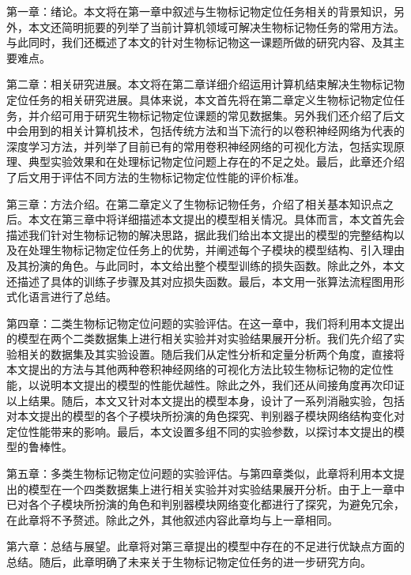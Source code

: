 第一章：绪论。本文将在第一章中叙述与生物标记物定位任务相关的背景知识，另外，本文还简明扼要的列举了当前计算机领域可解决生物标记物任务的常用方法。与此同时，我们还概述了本文的针对生物标记物这一课题所做的研究内容、及其主要难点。

第二章：相关研究进展。本文将在第二章详细介绍运用计算机结束解决生物标记物定位任务的相关研究进展。具体来说，本文首先将在第二章定义生物标记物定位任务，并介绍可用于研究生物标记物定位课题的常见数据集。另外我们还介绍了后文中会用到的相关计算机技术，包括传统方法和当下流行的以卷积神经网络为代表的深度学习方法，并列举了目前已有的常用卷积神经网络的可视化方法，包括实现原理、典型实验效果和在处理标记物定位问题上存在的不足之处。最后，此章还介绍了后文用于评估不同方法的生物标记物定位性能的评价标准。

第三章：方法介绍。在第二章定义了生物标记物任务，介绍了相关基本知识点之后。本文在第三章中将详细描述本文提出的模型相关情况。具体而言，本文首先会描述我们针对生物标记物的解决思路，据此我们给出本文提出的模型的完整结构以及在处理生物标记物定位任务上的优势，并阐述每个子模块的模型结构、引入理由及其扮演的角色。与此同时，本文给出整个模型训练的损失函数。除此之外，本文还描述了具体的训练子步骤及其对应损失函数。最后，本文用一张算法流程图用形式化语言进行了总结。

第四章：二类生物标记物定位问题的实验评估。在这一章中，我们将利用本文提出的模型在两个二类数据集上进行相关实验并对实验结果展开分析。我们先介绍了实验相关的数据集及其实验设置。随后我们从定性分析和定量分析两个角度，直接将本文提出的方法与其他两种卷积神经网络的可视化方法比较生物标记物的定位性能，以说明本文提出的模型的性能优越性。除此之外，我们还从间接角度再次印证以上结果。随后，本文又针对本文提出的模型本身，设计了一系列消融实验，包括对本文提出的模型的各个子模块所扮演的角色探究、判别器子模块网络结构变化对定位性能带来的影响。最后，本文设置多组不同的实验参数，以探讨本文提出的模型的鲁棒性。

第五章：多类生物标记物定位问题的实验评估。与第四章类似，此章将利用本文提出的模型在一个四类数据集上进行相关实验并对实验结果展开分析。由于上一章中已对各个子模块所扮演的角色和判别器模块网络变化都进行了探究，为避免冗余，在此章将不予赘述。除此之外，其他叙述内容此章均与上一章相同。

第六章：总结与展望。此章将对第三章提出的模型中存在的不足进行优缺点方面的总结。随后，此章明确了未来关于生物标记物定位任务的进一步研究方向。
